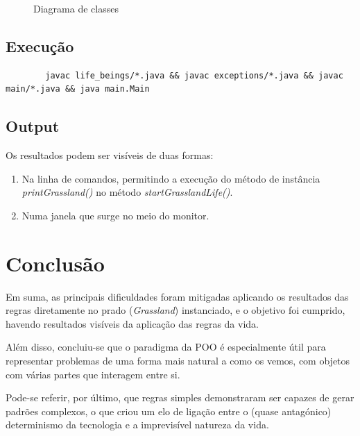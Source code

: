 \documentclass {report}
\begin{document}
\begin{figure}[h]
		\caption{Diagrama de classes}
	\end{figure}
\clearpage

\subsection{Execução}	
	\begin{verbatim}
		javac life_beings/*.java && javac exceptions/*.java && javac main/*.java && java main.Main 
	\end{verbatim}

\subsection{Output}
	Os resultados podem ser visíveis de duas formas:
	\begin{enumerate}
		\item Na linha de comandos, permitindo a execução do método de instância 
		   		\textit{printGrassland()} no método \textit{startGrasslandLife()}.
		\item Numa janela que surge no meio do monitor.
	\end{enumerate}

\section{Conclusão}
	Em suma, as principais dificuldades foram mitigadas aplicando os resultados 
	das regras diretamente no prado (\textit{Grassland}) instanciado, 
	e o objetivo foi cumprido, havendo resultados visíveis da aplicação das regras 
	da vida. 

	Além disso, concluiu-se que o paradigma da POO é especialmente útil 
	para representar problemas de uma forma mais natural a como os vemos,
	com objetos com várias partes que interagem entre si.

	Pode-se referir, por último, que regras simples demonstraram ser capazes 
	de gerar padrões complexos, o que criou um elo de ligação entre o 
	(quase antagónico) determinismo da tecnologia e a imprevisível natureza da vida.
\end{document}
